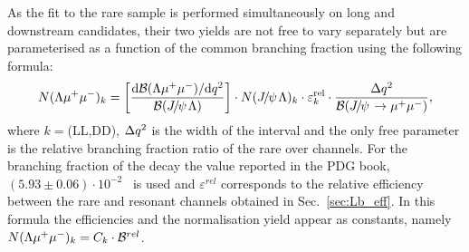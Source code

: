 \begin{table}
\centering
\caption{Predicted numbers of $\Bz\ra\KS\mumu$ events in each considered \qsq interval.}
\label{tab:KSprediction}
\end{table}

As the fit to the rare sample is performed simultaneously on long and downstream candidates,
their two yields are not free to vary separately but are parameterised
as a function of the common branching fraction using the following formula:
%
\begin{equation}
N(\Lz\mumu)_{k}  = \left[ \frac{\mathrm{d}\mathcal{B}(\Lz\mumu)/\mathrm{d}\qsq}{\mathcal{B}(\jpsi\Lz)} \right]  \cdot
N(\jpsi\Lz)_{k} \cdot \varepsilon^{\mathrm{rel}}_{k} \cdot \frac {\Delta\qsq} { \mathcal{B}(\jpsi\to\mumu) },
\label{eq:relYield}
\end{equation}
%
where $k = $(LL,DD), $\Delta q^2$ is the width of the \qsq interval and the only free parameter is the relative branching 
fraction ratio of the rare over \jpsi channels. For the branching fraction of the \jpsi\to\mumu decay the value 
reported in the PDG book, \mbox{$(5.93 \pm 0.06)\cdot 10^{-2}$~\cite{PDG2014}} is used and $\varepsilon^{rel}$ corresponds to
the relative efficiency between the rare and resonant channels obtained in Sec.~\ref{sec:Lb_eff}. 
In this formula the efficiencies and the normalisation yield appear as constants, namely 
$N(\Lambda\mu^+\mu^-)_{k} = C_k \cdot \mathcal{B}^{rel}$. 


